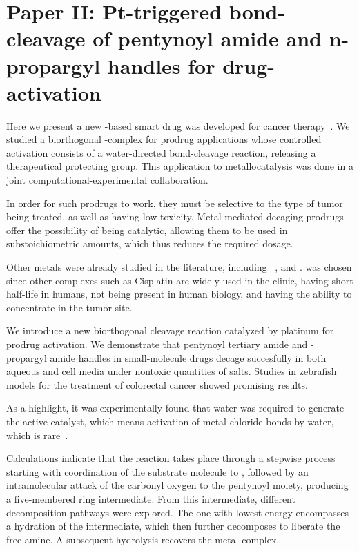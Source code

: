 \chapter{Paper II:\@
  Pt-triggered bond-cleavage of pentynoyl amide
  and n-propargyl handles for drug-activation
 }%
\label{ch:paper2}


Here we present a new -based smart drug was developed for cancer therapy~\cite{Oliveira2020}.
We studied a biorthogonal -complex for prodrug applications whose controlled activation consists
of a water-directed bond-cleavage reaction, releasing a therapeutical protecting group.
This application to metallocatalysis was done in a joint computational-experimental collaboration.

In order for such prodrugs to work, they must be selective to the type of tumor
being treated, as well as having low toxicity.
Metal-mediated decaging prodrugs offer the possibility of being catalytic,
allowing them to be used in substoichiometric amounts, which thus reduces the
required dosage.

Other metals were already studied in the literature, including
~\cite{Coelho2019},  and .
 was chosen since other complexes such as Cisplatin are widely used in
the clinic, having short half-life in humans, not being present in human
biology, and having the ability to concentrate in the tumor site.

We introduce a new biorthogonal cleavage reaction catalyzed by platinum for
prodrug activation.
We demonstrate that pentynoyl tertiary amide and -propargyl amide handles
in small-molecule drugs decage succesfully in both aqueous and cell media under
nontoxic quantities of  salts.
Studies in zebrafish models for the treatment of colorectal cancer showed
promising results.


As a highlight, it was experimentally found that water was required to generate
the active catalyst, which means activation of metal-chloride bonds by water,
which is rare~\cite{Vidal_2018}.


Calculations indicate that the reaction takes place through a stepwise process
starting with coordination of the substrate molecule to , followed by
an intramolecular attack of the carbonyl oxygen to the pentynoyl moiety,
producing a five-membered ring intermediate.
From this intermediate, different decomposition pathways were explored.
The one with lowest energy encompasses a hydration of the intermediate, which
then further decomposes to liberate the free amine.
A subsequent hydrolysis recovers the metal complex.

